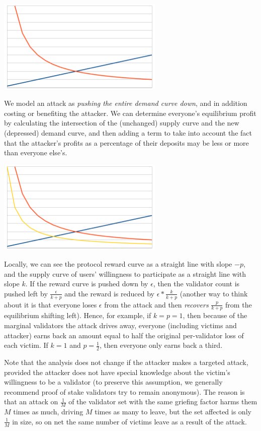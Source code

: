 \documentclass[12pt]{article}
\begin{document}
\includegraphics[width=300px]{disc_chart1.png}

We model an attack as \emph{pushing the entire demand curve down}, and in addition costing or benefiting the attacker. We can determine everyone's equilibrium profit by calculating the intersection of the (unchanged) supply curve and the new (depressed) demand curve, and then adding a term to take into account the fact that the attacker's profits as a percentage of their deposits may be less or more than everyone else's.

\includegraphics[width=300px]{disc_chart2.png}

Locally, we can see the protocol reward curve as a straight line with slope $-p$, and the supply curve of users' willingness to participate as a straight line with slope $k$. If the reward curve is pushed down by $\epsilon$, then the validator count is pushed left by $\frac{\epsilon}{k+p}$ and the reward is reduced by $\epsilon * \frac{k}{k + p}$ (another way to think about it is that everyone loses $\epsilon$ from the attack and then \emph{recovers} $\frac{p}{k+p}$ from the equilibrium shifting left). Hence, for example, if $k = p = 1$, then because of the marginal validators the attack drives away, everyone (including victims and attacker) earns back an amount equal to half the original per-validator loss of each victim. If $k = 1$ and $p = \frac{1}{2}$, then everyone only earns back a third.

Note that the analysis does not change if the attacker makes a targeted attack, provided the attacker does not have special knowledge about the victim's willingness to be a validator (to preserve this assumption, we generally recommend proof of stake validators try to remain anonymous). The reason is that an attack on $\frac{1}{M}$ of the validator set with the same griefing factor harms them $M$ times as much, driving $M$ times as many to leave, but the set affected is only $\frac{1}{M}$ in size, so on net the same number of victims leave as a result of the attack.
\end{document}
